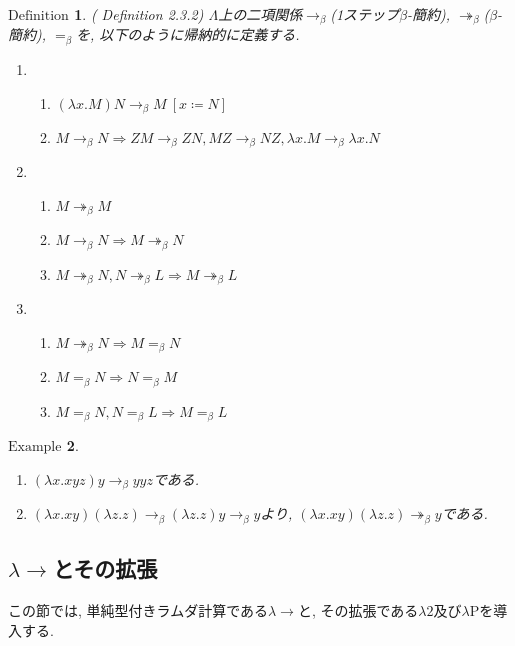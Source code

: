 \documentclass[11pt]{jsreport}
\theoremstyle{mystyle}
\newtheorem{df}{$\textrm{Definition}$}[section]
\newtheorem{ex}[df]{$\textrm{Example}$}
\newcommand{\Lra}{\Longrightarrow}
\newcommand{\thra}{\twoheadrightarrow}
\newcommand{\lama}{\lambda \! \! \to}
\newcommand{\0}{\textbf{0}}
\begin{document}
\begin{shadebox}
  \begin{df}{(\cite{Bar} Definition 2.3.2)}
    $\Lambda$上の二項関係$\to_{\beta}$(1ステップ$\beta$-簡約), 
    $\thra_{\beta}$($\beta$-簡約), 
    $=_{\beta}$を, 
    以下のように帰納的に定義する. 
    \begin{enumerate}
      \item \begin{enumerate}
        \item $(\lambda x .M)N \to_{\beta} M\ [x \coloneqq N]$
        \item $M \to_{\beta} N \Lra ZM \to_{\beta} ZN, MZ \to_{\beta} NZ,
                 \lambda x .M \to_{\beta} \lambda x .N$
               \end{enumerate}
      \item \begin{enumerate}
        \item $M \thra_{\beta} M$
        \item $M \to_{\beta} N \Lra M \thra_{\beta} N$
        \item $M \thra_{\beta} N, N \thra_{\beta} L \Lra M \thra_{\beta} L$
               \end{enumerate}
      \item \begin{enumerate}
        \item $M \thra_{\beta} N \Lra M =_{\beta} N$
        \item $M =_{\beta} N \Lra N =_{\beta} M$
        \item $M =_{\beta} N, N =_{\beta} L \Lra M =_{\beta} L$
               \end{enumerate}
    \end{enumerate}
  \end{df}
\end{shadebox}
\begin{ex}
  \begin{enumerate}
    \item $(\lambda x . xyz)y \to_{\beta} yyz$である. 
    \item $(\lambda x . xy)(\lambda z . z) \to_{\beta} (\lambda z . z) y \to_{\beta} y$より, 
             $(\lambda x . xy)(\lambda z . z) \thra_{\beta} y$である. 
  \end{enumerate}
\end{ex}
\subsection{$\lama$とその拡張}
この節では, 単純型付きラムダ計算である$\lama$と, その拡張である$\lambda 2$及び$\lambda$Pを導入する. 
\end{document}
